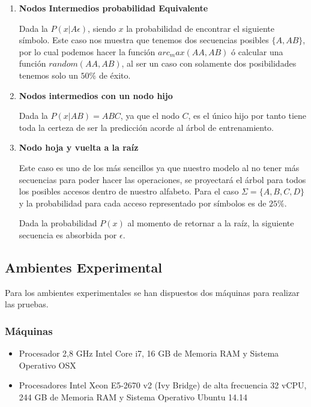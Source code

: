 \begin{enumerate}
	\item \textbf{Nodos Intermedios probabilidad Equivalente}
	
	Dada la $P( x | A\epsilon  )$, siendo $x$ la probabilidad de encontrar el siguiente símbolo. Este caso nos muestra que tenemos dos secuencias posibles $\{A,AB\}$, por lo cual podemos hacer la función $arc_max(AA,AB)$ ó calcular una función $random(AA,AB)$, al ser un caso con solamente dos posibilidades tenemos solo un $50\%$ de éxito.
	
	
	\item \textbf{Nodos intermedios con un nodo hijo }
	
	Dada la $P( x | AB  )  = ABC$, ya que  el nodo $C$, es el único hijo por tanto tiene toda la certeza de ser la predicción acorde al árbol de entrenamiento.
		
		
		
	\item \textbf{Nodo hoja y vuelta a la raíz}	
	
	Este caso es uno de los más sencillos ya que nuestro modelo al no tener más secuencias para poder hacer las operaciones, se proyectará el árbol para todos los posibles accesos dentro de nuestro alfabeto. Para el caso $\Sigma = \{A,B,C,D \} $ y la probabilidad para cada acceso representado por símbolos es de $25\%$.
	
	
	Dada la probabilidad $P( x ) $ al momento de retornar a la raíz, la siguiente secuencia es absorbida por $\epsilon$.
	

\end{enumerate}



\subsection{Ambientes Experimental}

Para los ambientes experimentales se han dispuestos dos máquinas para realizar las pruebas. 

\subsubsection{Máquinas}
	\begin{itemize}
		\item Procesador 2,8 GHz Intel Core i7, 16 GB de Memoria RAM y Sistema Operativo OSX
		\item Procesadores Intel Xeon E5-2670 v2 (Ivy Bridge) de alta frecuencia 32 vCPU, 244 GB de Memoria RAM y Sistema Operativo Ubuntu 14.14 
	\end{itemize}
	

